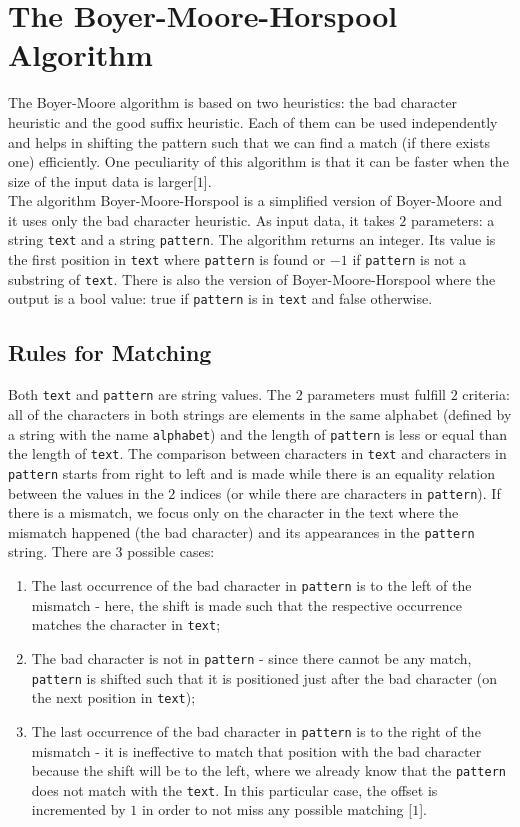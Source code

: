 \chapter{The Boyer-Moore-Horspool Algorithm}

The Boyer-Moore algorithm is based on two heuristics: the bad character heuristic and the good suffix heuristic. Each of them can be used independently and helps in shifting the pattern such that we can find a match (if there exists one) efficiently. One peculiarity of this algorithm is that it can be faster when the size of the input data is larger[\(1\)]. \\
\indent The algorithm Boyer-Moore-Horspool is a simplified version of Boyer-Moore and it uses only the bad character heuristic. As input data, it takes \(2\) parameters: a string \texttt{text} and a string \texttt{pattern}. The algorithm returns an integer. Its value is the first position in \texttt{text} where \texttt{pattern} is found or \(-1\) if \texttt{pattern} is not a substring of \texttt{text}. There is also the version of Boyer-Moore-Horspool where the output is a bool value: true if \texttt{pattern} is in \texttt{text} and false otherwise.

\section{Rules for Matching}

Both \texttt{text} and \texttt{pattern} are string values. The \(2\) parameters must fulfill \(2\) criteria: all of the characters in both strings are elements in the same alphabet (defined by a string with the name \texttt{alphabet}) and the length of \texttt{pattern} is less or equal than the length of \texttt{text}. The comparison between characters in \texttt{text} and characters in \texttt{pattern} starts from right to left and is made while there is an equality relation between the values in the \(2\) indices (or while there are characters in \texttt{pattern}). If there is a mismatch, we focus only on the character in the text where the mismatch happened (the bad character) and its appearances in the \texttt{pattern} string. There are \(3\) possible cases:
\begin{enumerate}
\item The last occurrence of the bad character in \texttt{pattern} is to the left of the mismatch - here, the shift is made such that the respective occurrence matches the character in \texttt{text};
\item The bad character is not in \texttt{pattern} - since there cannot be any match, \texttt{pattern} is shifted such that it is positioned just after the bad character (on the next position in \texttt{text});
\item The last occurrence of the bad character in \texttt{pattern} is to the right of the mismatch - it is ineffective to match that position with the bad character because the shift will be to the left, where we already know that the \texttt{pattern} does not match with the \texttt{text}. In this particular case, the offset is incremented by \(1\) in order to not miss any possible matching [\(1\)].
\end{enumerate}

